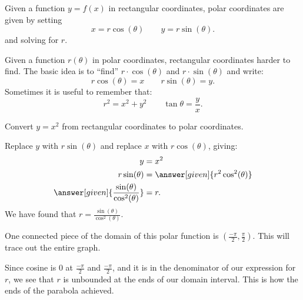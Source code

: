 \documentclass{ximera}
\begin{document}
Given a function $y=f(x)$ in rectangular coordinates, polar coordinates
are given by setting
\[
x=r\cos(\theta)\qquad y=r\sin(\theta).
\]
and solving for $r$.

Given a function $r(\theta)$ in polar coordinates, rectangular
coordinates harder to find. The basic idea is to ``find'' $r\cdot
\cos(\theta)$ and $r\cdot \sin(\theta)$ and write:
\[
r\cos(\theta) = x\qquad r\sin(\theta) = y.
\]
Sometimes it is useful to remember that:
\[
r^2=x^2+y^2\qquad \tan \theta = \frac yx.
\]


\begin{example}
  Convert $y=x^2$ from rectangular coordinates to polar coordinates.
  \begin{explanation}
    Replace $y$ with $r\sin(\theta)$ and replace $x$ with $r\cos(\theta)$, giving:
      \begin{align*}
	y &=x^2\\
	r\sin(\theta) &= \answer[given]{r^2\cos^2(\theta)}\\
	\answer[given]{\frac{\sin(\theta)}{\cos^2(\theta)}}  &= r.
      \end{align*}
      We have found that $r=\frac{\sin(\theta)}{\cos^2(\theta)}$. 

      One connected piece of the domain of this polar function is $\left( \frac{-\pi}{2}, \frac{\pi}{2} \right)$. This will trace out the entire graph.




      Since cosine is $0$ at $\frac{-\pi}{2}$ and $\frac{-\pi}{2}$, and it is in the denominator of our expression for $r$, we see that $r$ is unbounded at the ends of our domain interval.  This is how the ends of the parabola achieved.





  \end{explanation}







\begin{center}
\end{center}



\end{example}
\end{document}
